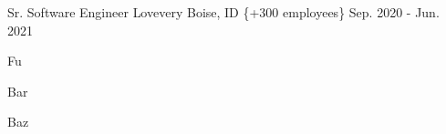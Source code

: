 \cventry
{Sr. Software Engineer} %
{Lovevery} %
{Boise, ID \{+300 employees\}} %
{Sep. 2020   - Jun. 2021} %
{
  \begin{cvitems} %
    \item {Fu}
    \item {Bar}
    \item {Baz}
  \end{cvitems}
}
